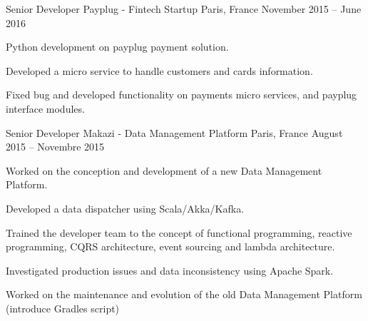 

\begin{cventries}

  \cventry
    {Senior Developer} %
    {Payplug - Fintech Startup} %
    {Paris, France} %
    {November 2015 – June 2016} %
    {
      \begin{cvitems} %
        \item {Python development on payplug payment solution.}
        \item {Developed a micro service to handle customers and cards information.}
        \item {Fixed bug and developed functionality on payments micro services, and payplug interface modules.}
      \end{cvitems}
    }

  \cventry
    {Senior Developer} %
    {Makazi - Data Management Platform} %
    {Paris, France} %
    {August 2015 – Novembre 2015} %
    {
      \begin{cvitems} %
        \item {Worked on the conception and development of a new Data Management Platform.}
        \item {Developed a data dispatcher using Scala/Akka/Kafka.}
        \item {Trained the developer team to the concept of functional programming, reactive programming, CQRS architecture, event sourcing and lambda architecture.}
        \item {Investigated production issues and data inconsistency using Apache Spark.}
        \item {Worked on the maintenance and evolution of the old Data Management Platform (introduce Gradles script)}
      \end{cvitems}
    }


\end{cventries}
